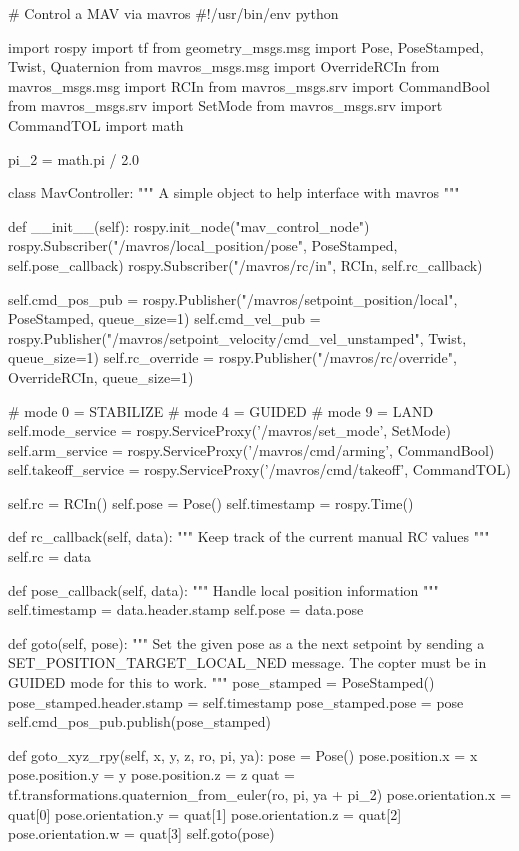 \documentclass[a4paper,12pt]{article}
\begin{document}
\begin{MyCode}

# Control a MAV via mavros
#!/usr/bin/env python

import rospy
import tf
from geometry_msgs.msg import Pose, PoseStamped, Twist, Quaternion
from mavros_msgs.msg import OverrideRCIn
from mavros_msgs.msg import RCIn
from mavros_msgs.srv import CommandBool
from mavros_msgs.srv import SetMode
from mavros_msgs.srv import CommandTOL
import math

pi_2 = math.pi / 2.0

class MavController:
	"""
	A simple object to help interface with mavros
	"""
	
	def __init__(self):
		rospy.init_node("mav_control_node")
		rospy.Subscriber("/mavros/local_position/pose", PoseStamped, self.pose_callback)
		rospy.Subscriber("/mavros/rc/in", RCIn, self.rc_callback)
		
		self.cmd_pos_pub = rospy.Publisher("/mavros/setpoint_position/local", PoseStamped, queue_size=1)
		self.cmd_vel_pub = rospy.Publisher("/mavros/setpoint_velocity/cmd_vel_unstamped", Twist, queue_size=1)
		self.rc_override = rospy.Publisher("/mavros/rc/override", OverrideRCIn, queue_size=1)
		
		# mode 0 = STABILIZE
		# mode 4 = GUIDED
		# mode 9 = LAND
		self.mode_service = rospy.ServiceProxy('/mavros/set_mode', SetMode)
		self.arm_service = rospy.ServiceProxy('/mavros/cmd/arming', CommandBool)
		self.takeoff_service = rospy.ServiceProxy('/mavros/cmd/takeoff', CommandTOL)
		
		self.rc = RCIn()
		self.pose = Pose()
		self.timestamp = rospy.Time()
		
	def rc_callback(self, data):
		"""
		Keep track of the current manual RC values
		"""
		self.rc = data
		
	def pose_callback(self, data):
		"""
		Handle local position information
		"""
		self.timestamp = data.header.stamp
		self.pose = data.pose
		
	def goto(self, pose):
		"""
		Set the given pose as a the next setpoint by sending
		a SET_POSITION_TARGET_LOCAL_NED message. The copter must
		be in GUIDED mode for this to work.
		"""
		pose_stamped = PoseStamped()
		pose_stamped.header.stamp = self.timestamp
		pose_stamped.pose = pose
		self.cmd_pos_pub.publish(pose_stamped)
		
	def goto_xyz_rpy(self, x, y, z, ro, pi, ya):
		pose = Pose()
		pose.position.x = x
		pose.position.y = y
		pose.position.z = z
		quat = tf.transformations.quaternion_from_euler(ro, pi, ya + pi_2)
		pose.orientation.x = quat[0]
		pose.orientation.y = quat[1]
		pose.orientation.z = quat[2]
		pose.orientation.w = quat[3]
		self.goto(pose)
		

\end{MyCode}
\end{document}
